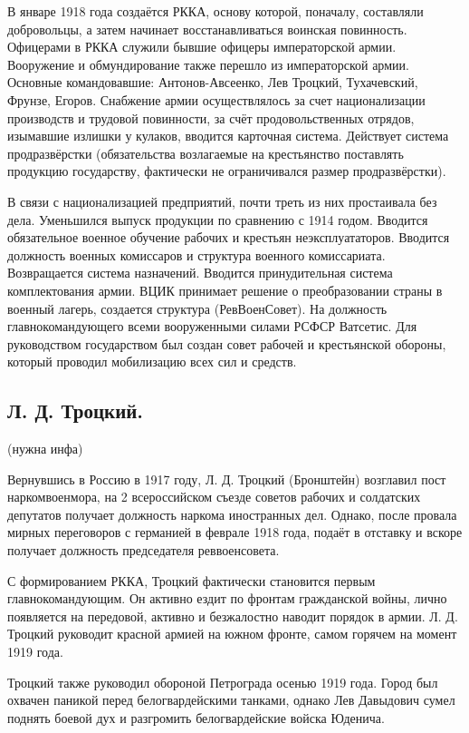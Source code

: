 В январе 1918 года создаётся РККА, основу которой, поначалу, составляли добровольцы, а затем начинает восстанавливаться воинская повинность. Офицерами в РККА служили бывшие офицеры императорской армии. Вооружение и обмундирование также перешло из императорской армии. 
Основные командовавшие: Антонов-Авсеенко, Лев Троцкий, Тухачевский, Фрунзе, Егоров.
Снабжение армии осуществлялось за счет национализации производств и трудовой повинности, за счёт продовольственных отрядов, изымавшие излишки у кулаков, вводится карточная система. Действует система продразвёрстки (обязательства возлагаемые на крестьянство поставлять продукцию государству, фактически не ограничивался размер продразвёрстки).

В связи с национализацией предприятий, почти треть из них простаивала без дела. Уменьшился выпуск продукции по сравнению с 1914 годом.
Вводится обязательное военное обучение рабочих и крестьян неэксплуататоров. Вводится должность военных комиссаров и структура военного комиссариата. Возвращается система назначений. Вводится принудительная система комплектования армии.
ВЦИК принимает решение о преобразовании страны в военный лагерь, создается структура (РевВоенСовет). На должность главнокомандующего всеми вооруженными силами РСФСР Ватсетис. Для руководством государством был создан совет рабочей и крестьянской обороны, который проводил мобилизацию всех сил и средств.

\subsection{Л. Д. Троцкий.} (нужна инфа)

Вернувшись в Россию в 1917 году, Л. Д. Троцкий (Бронштейн) возглавил пост наркомвоенмора, на 2 всероссийском съезде советов рабочих и солдатских депутатов получает должность наркома иностранных дел. Однако, после провала  мирных переговоров с германией в феврале 1918 года, подаёт в отставку и вскоре получает должность председателя реввоенсовета. 

С формированием РККА, Троцкий фактически становится первым главнокомандующим. Он активно ездит по фронтам гражданской войны, лично появляется на передовой, активно и безжалостно наводит порядок в армии. Л. Д. Троцкий руководит красной армией на южном фронте, самом горячем на момент 1919 года.

Троцкий также руководил обороной Петрограда осенью 1919 года. Город был охвачен паникой перед белогвардейскими танками, однако Лев Давыдович сумел поднять боевой дух и разгромить белогвардейские войска Юденича.

